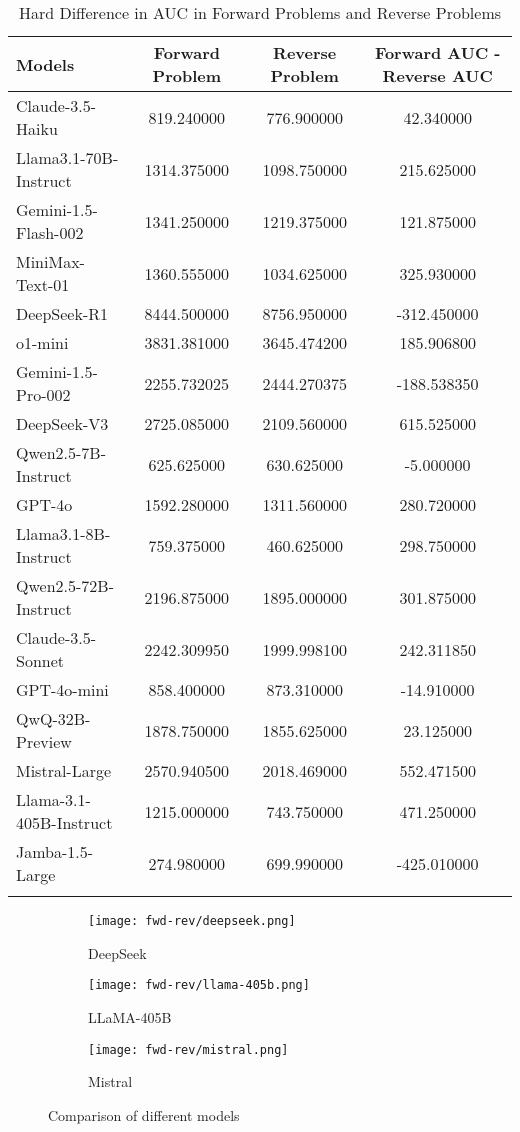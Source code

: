 \begin{longtable}{|l|c|c|c|}
\hline
\textbf{Models} & \textbf{Forward Problem} & \textbf{Reverse Problem} & \textbf{Forward AUC - Reverse AUC} \\ \hline
Claude-3.5-Haiku & 819.240000 & 776.900000 & 42.340000 \\ \hline
Llama3.1-70B-Instruct & 1314.375000 & 1098.750000 & 215.625000 \\ \hline
Gemini-1.5-Flash-002 & 1341.250000 & 1219.375000 & 121.875000 \\ \hline
MiniMax-Text-01 & 1360.555000 & 1034.625000 & 325.930000 \\ \hline
\rowcolor{yellow!20}
DeepSeek-R1 & 8444.500000 & 8756.950000 & -312.450000 \\ \hline
o1-mini & 3831.381000 & 3645.474200 & 185.906800 \\ \hline
\rowcolor{yellow!20}
Gemini-1.5-Pro-002 & 2255.732025 & 2444.270375 & -188.538350 \\ \hline
DeepSeek-V3 & 2725.085000 & 2109.560000 & 615.525000 \\ \hline
\rowcolor{yellow!20}
Qwen2.5-7B-Instruct & 625.625000 & 630.625000 & -5.000000 \\ \hline
GPT-4o & 1592.280000 & 1311.560000 & 280.720000 \\ \hline
Llama3.1-8B-Instruct & 759.375000 & 460.625000 & 298.750000 \\ \hline
Qwen2.5-72B-Instruct & 2196.875000 & 1895.000000 & 301.875000 \\ \hline
Claude-3.5-Sonnet & 2242.309950 & 1999.998100 & 242.311850 \\ \hline
\rowcolor{yellow!20}
GPT-4o-mini & 858.400000 & 873.310000 & -14.910000 \\ \hline
QwQ-32B-Preview & 1878.750000 & 1855.625000 & 23.125000 \\ \hline
Mistral-Large & 2570.940500 & 2018.469000 & 552.471500 \\ \hline
Llama-3.1-405B-Instruct & 1215.000000 & 743.750000 & 471.250000 \\ \hline
\rowcolor{yellow!20}
Jamba-1.5-Large & 274.980000 & 699.990000 & -425.010000 \\ \hline 
\caption{Hard Difference in AUC in Forward Problems and Reverse Problems} 
\end{longtable} 

\begin{figure}[h]
  \centering
  \begin{subfigure}[b]{0.3\textwidth}
    \texttt{[image: fwd-rev/deepseek.png]}
    \caption{DeepSeek}
  \end{subfigure}
  \hfill
  \begin{subfigure}[b]{0.3\textwidth}
    \texttt{[image: fwd-rev/llama-405b.png]}
    \caption{LLaMA-405B}
  \end{subfigure}
  \hfill
  \begin{subfigure}[b]{0.3\textwidth}
    \texttt{[image: fwd-rev/mistral.png]}
    \caption{Mistral}
  \end{subfigure}
  \caption{Comparison of different models}
  \label{fig:models}
\end{figure} 

